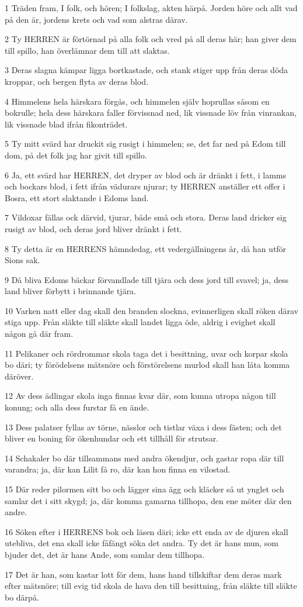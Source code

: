 \par 1 Träden fram, I folk, och hören; I folkslag, akten härpå. Jorden höre och allt vad på den är, jordens krets och vad som alstras därav.
\par 2 Ty HERREN är förtörnad på alla folk och vred på all deras här; han giver dem till spillo, han överlämnar dem till att slaktas.
\par 3 Deras slagna kämpar ligga bortkastade, och stank stiger upp från deras döda kroppar, och bergen flyta av deras blod.
\par 4 Himmelens hela härskara förgås, och himmelen själv hoprullas såsom en bokrulle; hela dess härskara faller förvissnad ned, lik vissnade löv från vinrankan, lik vissnade blad ifrån fikonträdet.
\par 5 Ty mitt svärd har druckit sig rusigt i himmelen; se, det far ned på Edom till dom, på det folk jag har givit till spillo.
\par 6 Ja, ett svärd har HERREN, det dryper av blod och är dränkt i fett, i lamms och bockars blod, i fett ifrån vädurars njurar; ty HERREN anställer ett offer i Bosra, ett stort slaktande i Edoms land.
\par 7 Vildoxar fällas ock därvid, tjurar, både små och stora. Deras land dricker sig rusigt av blod, och deras jord bliver dränkt i fett.
\par 8 Ty detta är en HERRENS hämndedag, ett vedergällningens år, då han utför Sions sak.
\par 9 Då bliva Edoms bäckar förvandlade till tjära och dess jord till svavel; ja, dess land bliver förbytt i brinnande tjära.
\par 10 Varken natt eller dag skall den branden slockna, evinnerligen skall röken därav stiga upp. Från släkte till släkte skall landet ligga öde, aldrig i evighet skall någon gå där fram.
\par 11 Pelikaner och rördrommar skola taga det i besittning, uvar och korpar skola bo däri; ty förödelsens mätsnöre och förstörelsens murlod skall han låta komma däröver.
\par 12 Av dess ädlingar skola inga finnas kvar där, som kunna utropa någon till konung; och alla dess furstar få en ände.
\par 13 Dess palatser fyllas av törne, nässlor och tistlar växa i dess fästen; och det bliver en boning för ökenhundar och ett tillhåll för strutsar.
\par 14 Schakaler bo där tillsammans med andra ökendjur, och gastar ropa där till varandra; ja, där kan Lilit få ro, där kan hon finna en vilostad.
\par 15 Där reder pilormen sitt bo och lägger sina ägg och kläcker så ut ynglet och samlar det i sitt skygd; ja, där komma gamarna tillhopa, den ene möter där den andre.
\par 16 Söken efter i HERRENS bok och läsen däri; icke ett enda av de djuren skall utebliva, det ena skall icke fåfängt söka det andra. Ty det är hans mun, som bjuder det, det är hans Ande, som samlar dem tillhopa.
\par 17 Det är han, som kastar lott för dem, hans hand tillskiftar dem deras mark efter mätsnöre; till evig tid skola de hava den till besittning, från släkte till släkte bo därpå.

